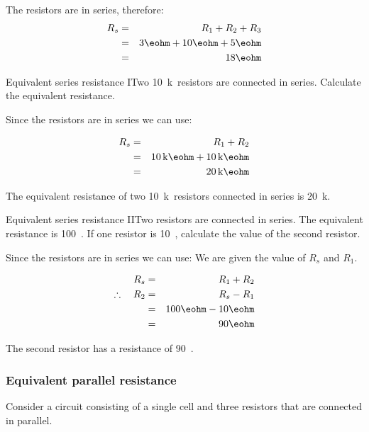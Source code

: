 The resistors are in series, therefore:
\begin{eqnarray*}
R_s&=&R_{1}+R_{2}+R_{3}\\
&=&3\eohm+10\eohm+5\eohm\\
&=&18\eohm
\end{eqnarray*}
\begin{wex}{Equivalent series resistance I}{Two 10~k\ohm\ resistors are connected in series. Calculate the equivalent resistance.}{

Since the resistors are in series we can use:

\begin{eqnarray*}
R_s&=&R_{1}+R_{2}\\
&=&10\,\rm{k}\eohm+10\,\rm{k}\eohm\\
&=&20\,\rm{k}\eohm
\end{eqnarray*}

The equivalent resistance of two 10~k\ohm\ resistors connected in series is 20~k\ohm.}
\end{wex}

\begin{wex}{Equivalent series resistance II}{Two resistors are connected in series. The equivalent resistance is 100~\ohm. If one resistor is 10~\ohm, calculate the value of the second resistor.}{

Since the resistors are in series we can use:
We are given the value of $R_s$ and $R_1$.

\begin{eqnarray*}
R_s&=&R_{1}+R_{2}\\
\therefore\quad R_2&=&R_s-R_1\\
&=&100\eohm-10\eohm\\
&=&90\eohm
\end{eqnarray*}

The second resistor has a resistance of 90~\ohm.}
\end{wex}

\subsubsection{Equivalent parallel resistance}
Consider a circuit consisting of a single cell and three resistors that are connected in parallel.

